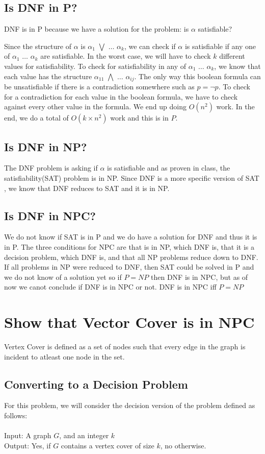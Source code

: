 \documentclass[12pt,twocolumn]{article}
\begin{document}
\subsection{ Is DNF in P? }
DNF is in P because we have a solution for the problem: is $\alpha$ satisfiable?

Since the structure of $\alpha$ is $\alpha_1$ $\bigvee$ $\dots$ $\alpha_k$, we can check if $\alpha$ is satisfiable if any one of $\alpha_1$ $\dots$ $\alpha_k$ are satisfiable. In the worst case, we will have to check $k$ different values for satisfiability.
To check for satisfiability in any of $\alpha_1$ $\dots$ $\alpha_k$, we know that each value has the structure $\alpha_{11}$ $\bigwedge$ $\dots$ $\alpha_{ij}$. The only way this boolean formula can be unsatisfiable if there is a contradiction somewhere such as $p = \neg p$. To check for a contradiction for each value in the boolean formula, we have to check against every other value in the formula. We end up doing $O(n^2)$ work.
In the end, we do a total of $O(k \times n^2)$ work and this is in $P$.

\subsection{ Is DNF in NP? }
The DNF problem is asking if $\alpha$ is satisfiable and as proven in class, the satisfiability(SAT) problem is in NP. Since DNF is a more specific version of SAT , we know that DNF reduces to SAT and it is in NP.

\subsection{ Is DNF in NPC? }
We do not know if SAT is in P and we do have a solution for DNF and thus it is in P. The three conditions for NPC are that is in NP, which DNF is, that it is a decision problem, which DNF is, and that all NP problems reduce down to DNF. If all problems in NP were reduced to DNF, then SAT could be solved in P and we do not know of a solution yet so if $P = NP$ then DNF is in NPC, but as of now we canot conclude if DNF is in NPC or not.
DNF is in NPC iff $P = NP$ 

\section{ Show that Vector Cover is in NPC }
Vertex Cover is defined as a set of nodes such that every edge in the graph is incident to atleast one node in the set. 
\subsection{Converting to a Decision Problem}
For this problem, we will consider the decision version of the problem defined as follows:\\
\\
Input: A graph $G$, and an integer $k$\\
Output: Yes, if $G$ contains a vertex cover of size $k$, no otherwise.\\
\end{document}
